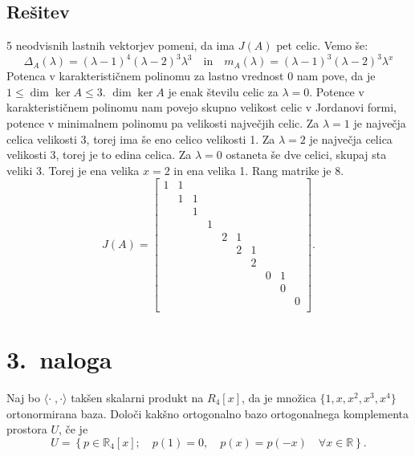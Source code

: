 \documentclass[a4,11pt]{article}
\newcommand{\R}{\mathbb{R}}
\begin{document}
\subsection*{Rešitev}
    5 neodvisnih lastnih vektorjev pomeni, da ima \(J(A)\) pet celic. Vemo še:
    \[
        \Delta_A(\lambda) = {\left(\lambda - 1\right)}^4{\left(\lambda - 2\right)}^3\lambda^3 \quad \text{in} \quad
        m_A(\lambda) = {\left(\lambda - 1\right)}^3{\left(\lambda - 2\right)}^3\lambda^x
    \]
    Potenca v karakterističnem polinomu za lastno vrednost \(0\) nam pove, da je \(1 \le \dim\ker A \le 3\). \(\dim\ker A\) je
    enak številu celic za \(\lambda = 0\).
    Potence v karakterističnem polinomu nam povejo skupno velikost celic v Jordanovi formi, potence v minimalnem polinomu pa
    velikosti največjih celic. Za \(\lambda = 1\) je največja celica velikosti 3, torej ima še eno celico velikosti 1.
    Za \(\lambda = 2\) je največja celica velikosti 3, torej je to edina celica. Za \(\lambda = 0\) ostaneta še dve celici,
    skupaj sta veliki 3. Torej je ena velika \(x = 2\) in ena velika 1. Rang matrike je \(8\).
    \[
        J(A) = \begin{bmatrix}
            1 & 1 &   &   &   &   &   &   &   &   \\
              & 1 & 1 &   &   &   &   &   &   &   \\
              &   & 1 &   &   &   &   &   &   &   \\
              &   &   & 1 &   &   &   &   &   &   \\
              &   &   &   & 2 & 1 &   &   &   &   \\
              &   &   &   &   & 2 & 1 &   &   &   \\
              &   &   &   &   &   & 2 &   &   &   \\
              &   &   &   &   &   &   & 0 & 1 &   \\
              &   &   &   &   &   &   &   & 0 &   \\
              &   &   &   &   &   &   &   &   & 0 \\
        \end{bmatrix}.
    \]

\section*{3.~naloga}
    Naj bo \(\langle \cdot \; , \cdot \rangle\) takšen skalarni produkt na \(R_4\left[x\right]\), da je množica \(\{1, x, x^2, x^3, x^4\}\) ortonormirana baza.
    Določi kakšno ortogonalno bazo ortogonalnega komplementa prostora \(U\), če je
    \[U = \left\{p \in \R_4\left[x\right]; \quad p(1) = 0, \quad p(x) = p(-x) \quad \forall x \in \R\right\}.\]
\end{document}
